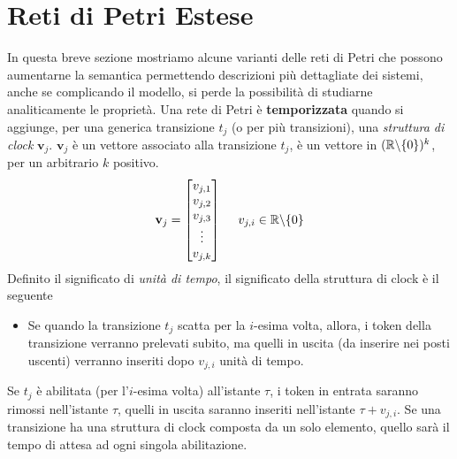 \documentclass[10pt, letterpaper]{report}
\begin{document}
\section{Reti di Petri Estese}
In questa breve sezione mostriamo alcune varianti delle reti di Petri che possono aumentarne la semantica permettendo descrizioni più dettagliate dei sistemi, anche se complicando il modello, si perde la possibilità di studiarne analiticamente le proprietà.\acc 
Una rete di Petri è \textbf{temporizzata} quando si aggiunge, per una generica transizione $t_j$ (o per più transizioni), una \textit{struttura di clock} $\mathbf v_j$.\acc 
$\mathbf v_j$ è un vettore associato alla transizione $t_j$, è un vettore in $({\mathbb R}\backslash\{0\})^k$, per un arbitrario $k$ positivo. 
$$ \mathbf v_j=\begin{bmatrix}
    v_{j,1}\\ 
    v_{j,2}\\ 
    v_{j,3}\\ \vdots \\ v_{j,k}
\end{bmatrix} \ \ \ \ v_{j,i}\in {\mathbb R}\backslash\{0\}$$
Definito il significato di \textit{unità di tempo}, il significato della struttura di clock è il seguente\begin{itemize}
    \item Se quando la transizione $t_j$ scatta per la $i$-esima volta, allora, i token della transizione verranno prelevati subito, ma quelli in uscita (da inserire nei posti uscenti) verranno inseriti dopo $v_{j,i}$ unità di tempo.
\end{itemize}
Se $t_j$ è abilitata (per l'$i$-esima volta) all'istante $\tau$, i token in entrata saranno rimossi nell'istante $\tau$, quelli in uscita saranno inseriti nell'istante $\tau+v_{j,i}$.
\acc 
Se una transizione ha una struttura di clock composta da un solo elemento, quello sarà il tempo di attesa ad ogni singola abilitazione. 
\end{document}
